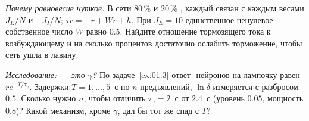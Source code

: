\begin{exercise}[\lvlB]
\label{ex:01:6}
\emph{Почему равновесие чуткое.} В сети $80\,\%$  и $20\,\%$ , каждый связан с каждым весами $J_E/N$ и $-J_I/N$; $\tau\dot r=-r+Wr+h$. При $J_E=10$ единственное ненулевое собственное число $W$ равно $0.5$. Найдите отношение тормозящего тока к возбуждающему и на сколько процентов достаточно ослабить торможение, чтобы сеть ушла в лавину.
\end{exercise}

\begin{exercise}[\lvlC]
\label{ex:01:7}
\emph{Исследование:  --- это $\gamma$?} По задаче~\ref{ex:01:3} ответ -нейронов на лампочку равен $re^{-T/\tau_\gamma}$. Задержки $T=1,\dots,5$~с по $n$ предъявлений, $\ln\delta$ измеряется с разбросом $0.5$. Сколько нужно $n$, чтобы отличить $\tau_\gamma=2$~с от $2.4$~с (уровень $0.05$, мощность $0.8$)? Какой механизм, кроме $\gamma$, дал бы тот же спад с $T$?
\end{exercise}
